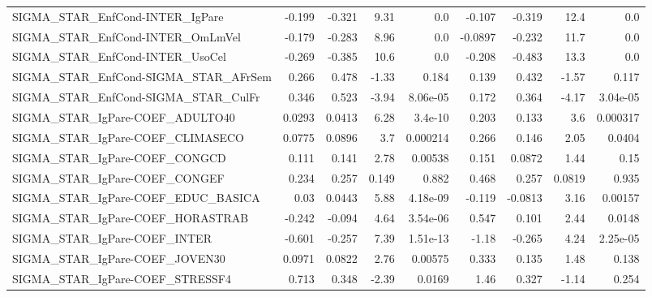 \begin{tabular}{lrrrrrrrr}
SIGMA\_STAR\_EnfCond-INTER\_IgPare       &      -0.199 &       -0.321 &    9.31 &      0.0 &     -0.107 &      -0.319 &         12.4 &           0.0 \\
SIGMA\_STAR\_EnfCond-INTER\_OmLmVel      &      -0.179 &       -0.283 &    8.96 &      0.0 &    -0.0897 &      -0.232 &         11.7 &           0.0 \\
SIGMA\_STAR\_EnfCond-INTER\_UsoCel       &      -0.269 &       -0.385 &    10.6 &      0.0 &     -0.208 &      -0.483 &         13.3 &           0.0 \\
SIGMA\_STAR\_EnfCond-SIGMA\_STAR\_AFrSem  &       0.266 &        0.478 &   -1.33 &    0.184 &      0.139 &       0.432 &        -1.57 &         0.117 \\
SIGMA\_STAR\_EnfCond-SIGMA\_STAR\_CulFr   &       0.346 &        0.523 &   -3.94 & 8.06e-05 &      0.172 &       0.364 &        -4.17 &      3.04e-05 \\
SIGMA\_STAR\_IgPare-COEF\_ADULTO40       &      0.0293 &       0.0413 &    6.28 &  3.4e-10 &      0.203 &       0.133 &          3.6 &      0.000317 \\
SIGMA\_STAR\_IgPare-COEF\_CLIMASECO      &      0.0775 &       0.0896 &     3.7 & 0.000214 &      0.266 &       0.146 &         2.05 &        0.0404 \\
SIGMA\_STAR\_IgPare-COEF\_CONGCD         &       0.111 &        0.141 &    2.78 &  0.00538 &      0.151 &      0.0872 &         1.44 &          0.15 \\
SIGMA\_STAR\_IgPare-COEF\_CONGEF         &       0.234 &        0.257 &   0.149 &    0.882 &      0.468 &       0.257 &       0.0819 &         0.935 \\
SIGMA\_STAR\_IgPare-COEF\_EDUC\_BASICA    &        0.03 &       0.0443 &    5.88 & 4.18e-09 &     -0.119 &     -0.0813 &         3.16 &       0.00157 \\
SIGMA\_STAR\_IgPare-COEF\_HORASTRAB      &      -0.242 &       -0.094 &    4.64 & 3.54e-06 &      0.547 &       0.101 &         2.44 &        0.0148 \\
SIGMA\_STAR\_IgPare-COEF\_INTER          &      -0.601 &       -0.257 &    7.39 & 1.51e-13 &      -1.18 &      -0.265 &         4.24 &      2.25e-05 \\
SIGMA\_STAR\_IgPare-COEF\_JOVEN30        &      0.0971 &       0.0822 &    2.76 &  0.00575 &      0.333 &       0.135 &         1.48 &         0.138 \\
SIGMA\_STAR\_IgPare-COEF\_STRESSF4       &       0.713 &        0.348 &   -2.39 &   0.0169 &       1.46 &       0.327 &        -1.14 &         0.254 \\

\end{tabular}
